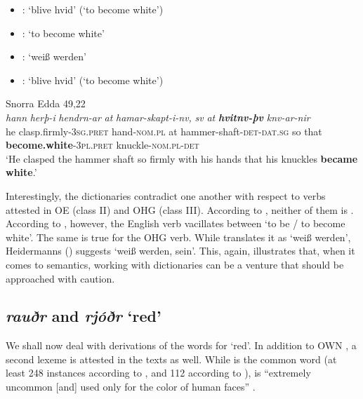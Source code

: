 \documentclass[output=paper,colorlinks,citecolor=brown]{langscibook}
\begin{document}
\begin{itemize}
\item {}: ‘blive hvid’ (‘to become white’)
\item {}: ‘to become white’
\item {}: ‘weiß werden’
\item {}: ‘blive hvid’ (‘to become white’)
\end{itemize}
 
\begin{exe} 
    \ex Snorra Edda 49,22 \label{ex:hvitna}\\
    \gll \textit{hann} \textit{herþ-i} \textit{hendrn-ar} \textit{at} \textit{hamar-skapt-i-nv,} \textit{sv} \textit{at} {\textit{\textbf{hvitnv-þv}} } \textit{knv-ar-nir}\\
     he {clasp.firmly-\textsc{3sg.pret}} hand-\textsc{nom.pl} at hammer-shaft-\textsc{det-dat.sg} so that \textbf{become.white}-\textsc{3pl.pret} knuckle-\textsc{nom.pl-det}\\
    \glt ‘He clasped the hammer shaft so firmly with his hands that his knuckles \textbf{became white}.’
\end{exe} 

Interestingly, the dictionaries contradict one another with respect to verbs attested in OE  (class II) and OHG  (class III). According to , neither of them is . According to , however, the English verb vacillates between ‘to be / to become white’. The same is true for the OHG verb. While \citet[397]{Schutzeichel2012} translates it as  ‘weiß werden’, Heidermanns () suggests ‘weiß werden, sein’. This, again, illustrates that, when it comes to semantics, working with dictionaries can be a venture that should be approached with caution. 

\subsection{\textit{rauðr} and \textit{rjóðr} ‘red’}
\label{sec:OWNred}

We shall now deal with derivations of the words for ‘red’. In addition to OWN , a second lexeme  is attested in the texts as well. While  is the common word (at least 248 instances according to , and 112 according to ),  is “extremely uncommon [and] used only for the color of human faces” \citep[120]{Crawford2014}. 
\end{document}
